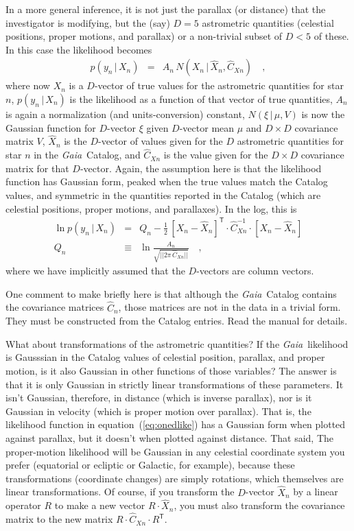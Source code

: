\documentclass[12pt, modern]{aastex62h}
\newcommand{\Gaia}{\textsl{Gaia}}
\newcommand{\equationname}{equation}
\newcommand{\given}{\,|\,}
\newcommand{\T}{^{\mathsf{T}}}
\newcommand{\inv}{^{-1}}
\begin{document}
In a more general inference, it is not just the parallax (or distance)
that the investigator is modifying, but the (say) $D=5$ astrometric quantities
(celestial positions, proper motions, and parallax)
or a non-trivial subset of $D<5$ of these.
In this case the likelihood becomes
\begin{eqnarray}
p(y_n\given X_n) &=& A_n\,N(X_n\given\hat{X}_n,\hat{C}_{Xn})
\label{eq:like}
\quad ,
\end{eqnarray}
where now
$X_n$ is a $D$-vector of true values for the astrometric quantities for star $n$,
$p(y_n\given X_n)$ is the likelihood as a function of that vector of true quantities,
$A_n$ is again a normalization (and units-conversion) constant,
$N(\xi\given\mu,V)$ is now the Gaussian function for $D$-vector $\xi$ given $D$-vector mean $\mu$ and $D\times D$ covariance matrix $V$,
$\hat{X}_n$ is the $D$-vector of values given for the $D$ astrometric quantities for star $n$ in the \Gaia\ Catalog,
and $\hat{C}_{Xn}$ is the value given for the $D\times D$ covariance matrix for that
$D$-vector.
Again, the assumption here is that the likelihood function has Gaussian form, peaked
when the true values match the Catalog values, and symmetric in the quantities
reported in the Catalog (which are celestial positions, proper motions, and parallaxes).
In the log, this is
\begin{eqnarray}
\ln p(y_n\given X_n) &=& Q_n - \frac{1}{2}\,[X_n - \hat{X}_n]\T\cdot\hat{C}_{Xn}\inv\cdot [X_n - \hat{X}_n]
\\
Q_n &\equiv& \ln\frac{A_n}{\sqrt{||2\pi\,\hat{C}_{Xn}||}}
\quad ,
\end{eqnarray}
where we have implicitly assumed that the $D$-vectors are column vectors.

One comment to make briefly here is that although the \Gaia\ Catalog contains
the covariance matrices $\hat{C}_n$, those matrices are not in the data in a
trivial form.
They must be constructed from the Catalog entries.
Read the manual for details.

What about transformations of the astrometric quantities?
If the \Gaia\ likelihood is Gausssian in the Catalog values of celestial position,
parallax, and proper motion, is it also Gaussian in other functions of those
variables?
The answer is that it is only Gaussian in strictly linear transformations
of these parameters.
It isn't Gaussian, therefore, in distance (which is inverse parallax), nor
is it Gaussian in velocity (which is proper motion over parallax).
That is, the likelihood function in \equationname~(\ref{eq:onedlike}) has a
Gaussian form when plotted against parallax, but it doesn't when plotted against
distance.
That said,
The proper-motion likelihood will be Gaussian in any celestial coordinate
system you prefer (equatorial or ecliptic or Galactic, for example),
because these transformations (coordinate changes)
are simply rotations, which themselves are linear transformations.
Of course,
if you transform the $D$-vector $\hat{X}_n$ by a linear operator $R$ to make a new
vector $R\cdot\hat{X}_n$, you must also transform the covariance matrix to the new
matrix $R\cdot\hat{C}_{Xn}\cdot R\T$.
\end{document}
